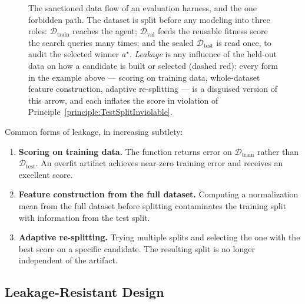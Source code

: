 \begin{figure}[htb!]
\begin{center}

\caption{The sanctioned data flow of an evaluation harness, and the one forbidden path.
The dataset is split before any modeling into three roles: $\mathcal{D}_{\mathrm{train}}$ reaches the agent; $\mathcal{D}_{\mathrm{val}}$ feeds the reusable fitness score the search queries many times; and the sealed $\mathcal{D}_{\mathrm{test}}$ is read once, to audit the selected winner $a^\star$.
\emph{Leakage} is any influence of the held-out data on how a candidate is built or selected (dashed red): every form in the example above --- scoring on training data, whole-dataset feature construction, adaptive re-splitting --- is a disguised version of this arrow, and each inflates the score in violation of Principle~\ref{principle:TestSplitInviolable}.}
\label{figure:Leakage}
\end{center}
\end{figure}

\begin{example}
Common forms of leakage, in increasing subtlety:
\begin{enumerate}
\item \textbf{Scoring on training data.} The function returns error on $\mathcal{D}_{\mathrm{train}}$ rather than $\mathcal{D}_{\mathrm{test}}$.
An overfit artifact achieves near-zero training error and receives an excellent score.
\item \textbf{Feature construction from the full dataset.} Computing a normalization mean from the full dataset before splitting contaminates the training split with information from the test split.
\item \textbf{Adaptive re-splitting.} Trying multiple splits and selecting the one with the best score on a specific candidate.
The resulting split is no longer independent of the artifact.
\end{enumerate}
\end{example}

\subsection{Leakage-Resistant Design}

